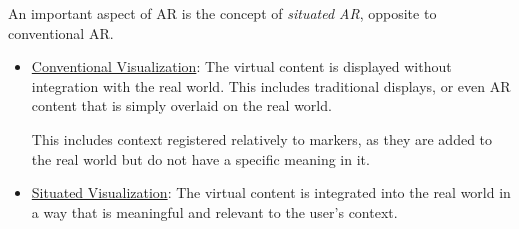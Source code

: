 An important aspect of AR is the concept of \emph{situated AR}, opposite to conventional AR.
\begin{itemize}
    \item \ul{Conventional Visualization}: The virtual content is displayed without integration with the real world. This includes traditional displays, or even AR content that is simply overlaid on the real world.
    
    This includes context registered relatively to markers, as they are added to the real world but do not have a specific meaning in it.
    \item \ul{Situated Visualization}: The virtual content is integrated into the real world in a way that is meaningful and relevant to the user's context.
\end{itemize}

